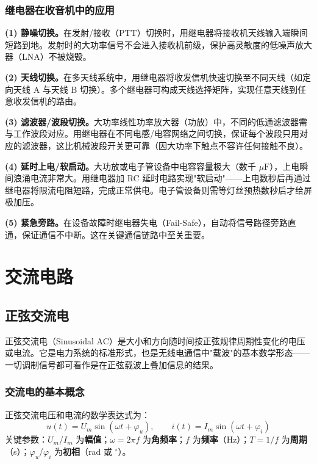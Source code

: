 \documentclass[12pt,UTF8]{ctexbook}
\begin{document}
\subsection{继电器在收音机中的应用}

\textbf{(1) 静噪切换。}在发射/接收（PTT）切换时，用继电器将接收机天线输入端瞬间短路到地。发射时的大功率信号不会进入接收机前级，保护高灵敏度的低噪声放大器（LNA）不被烧毁。

\textbf{(2) 天线切换。}在多天线系统中，用继电器将收发信机快速切换至不同天线（如定向天线 A 与天线 B 切换）。多个继电器可构成天线选择矩阵，实现任意天线到任意收发信机的路由。

\textbf{(3) 滤波器/波段切换。}大功率线性功率放大器（功放）中，不同的低通滤波器需与工作波段对应。用继电器在不同电感/电容网络之间切换，保证每个波段只用对应的滤波器，这比机械波段开关更可靠（因大功率下触点不容许任何接触不良）。

\textbf{(4) 延时上电/软启动。}大功放或电子管设备中电容容量极大（数千 $\mu\mathrm{F}$），上电瞬间浪涌电流非常大。用继电器加 RC 延时电路实现"软启动"——上电数秒后再通过继电器将限流电阻短路，完成正常供电。电子管设备则需等灯丝预热数秒后才给屏极加压。

\textbf{(5) 紧急旁路。}在设备故障时继电器失电（Fail-Safe），自动将信号路径旁路直通，保证通信不中断。这在关键通信链路中至关重要。



\chapter{交流电路}
\label{chap:ac_circuit}

\section{正弦交流电}
\label{sec:sine_ac}

正弦交流电（Sinusoidal AC）是大小和方向随时间按正弦规律周期性变化的电压或电流。它是电力系统的标准形式，也是无线电通信中"载波"的基本数学形态——一切调制信号都可看作是在正弦载波上叠加信息的结果。

\subsection{交流电的基本概念}

正弦交流电压和电流的数学表达式为：
\[
u(t) = U_m \sin(\omega t + \varphi_u), \qquad i(t) = I_m \sin(\omega t + \varphi_i)
\]
关键参数：$U_m$/$I_m$ 为\textbf{幅值}；$\omega = 2\pi f$ 为\textbf{角频率}；$f$ 为\textbf{频率}（Hz）；$T = 1/f$ 为\textbf{周期}（s）；$\varphi_u$/$\varphi_i$ 为\textbf{初相}（rad 或 $^\circ$）。
\end{document}
